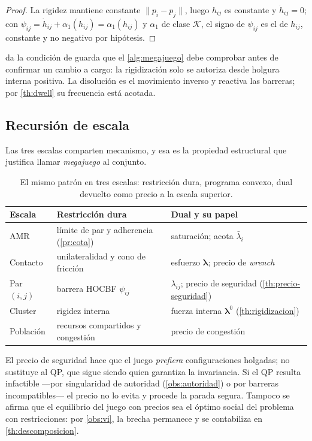 \begin{proof}
La rigidez mantiene constante $\|p_i-p_j\|$, luego $h_{ij}$ es constante y
$\dot h_{ij}=0$; con $\psi_{ij}=\dot h_{ij}+\alpha_1(h_{ij})=\alpha_1(h_{ij})$
y $\alpha_1$ de clase $\mathcal K$, el signo de $\psi_{ij}$ es el de $h_{ij}$,
constante y no negativo por hipótesis.
\end{proof}

 da la condición de guarda que el
\cref{alg:megajuego} debe comprobar antes de confirmar un cambio a
\textsf{cargo}: la rigidización solo se autoriza desde holgura interna positiva.
La disolución es el movimiento inverso y reactiva las barreras; por
\cref{th:dwell} su frecuencia está acotada.

\subsection{Recursión de escala}

Las tres escalas comparten mecanismo, y esa es la propiedad estructural que
justifica llamar \emph{megajuego} al conjunto.

\begin{table}[!ht]
\centering\small
\caption{El mismo patrón en tres escalas: restricción dura, programa convexo,
dual devuelto como precio a la escala superior.}
\label{tab:escalas}
\begin{tabularx}{\textwidth}{@{}llX@{}}
\toprule
Escala & Restricción dura & Dual y su papel \\
\midrule
AMR & límite de par y adherencia (\cref{pr:cota})
  & saturación; acota $\bar\lambda_i$ \\
Contacto & unilateralidad y cono de fricción
  & esfuerzo $\bm\lambda$; precio de \emph{wrench} \\
Par $(i,j)$ & barrera HOCBF $\psi_{ij}$
  & $\lambda_{ij}$; precio de seguridad (\cref{th:precio-seguridad}) \\
Cluster & rigidez interna
  & fuerza interna $\bm\lambda^{0}$ (\cref{th:rigidizacion}) \\
Población & recursos compartidos y congestión
  & precio de congestión \\
\bottomrule
\end{tabularx}
\end{table}

\begin{observacion}
\label{obs:clusters-limites}
El precio de seguridad hace que el juego \emph{prefiera} configuraciones
holgadas; no sustituye al QP, que sigue siendo quien garantiza la invariancia.
Si el QP resulta infactible —por singularidad de autoridad
(\cref{obs:autoridad}) o por barreras incompatibles— el precio no lo evita y
procede la parada segura. Tampoco se afirma que el equilibrio del juego con
precios sea el óptimo social del problema con restricciones: por
\cref{obs:vi}, la brecha permanece y se contabiliza en
\cref{th:descomposicion}.
\end{observacion}
